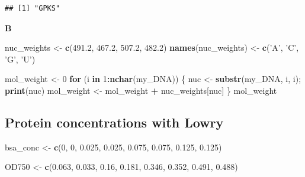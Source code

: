 \documentclass[]{book}
\newenvironment{Shaded}{\begin{snugshade}}{\end{snugshade}}
\newcommand{\ControlFlowTok}[1]{\textcolor[rgb]{0.13,0.29,0.53}{\textbf{#1}}}
\newcommand{\DecValTok}[1]{\textcolor[rgb]{0.00,0.00,0.81}{#1}}
\newcommand{\FloatTok}[1]{\textcolor[rgb]{0.00,0.00,0.81}{#1}}
\newcommand{\KeywordTok}[1]{\textcolor[rgb]{0.13,0.29,0.53}{\textbf{#1}}}
\newcommand{\NormalTok}[1]{#1}
\newcommand{\OperatorTok}[1]{\textcolor[rgb]{0.81,0.36,0.00}{\textbf{#1}}}
\newcommand{\StringTok}[1]{\textcolor[rgb]{0.31,0.60,0.02}{#1}}
\begin{document}
\begin{verbatim}
## [1] "GPKS"
\end{verbatim}

\textbf{B}

\begin{Shaded}
\begin{Highlighting}[]
\NormalTok{nuc_weights <-}\StringTok{ }\KeywordTok{c}\NormalTok{(}\FloatTok{491.2}\NormalTok{, }\FloatTok{467.2}\NormalTok{, }\FloatTok{507.2}\NormalTok{, }\FloatTok{482.2}\NormalTok{)}
\KeywordTok{names}\NormalTok{(nuc_weights) <-}\StringTok{ }\KeywordTok{c}\NormalTok{(}\StringTok{'A'}\NormalTok{, }\StringTok{'C'}\NormalTok{, }\StringTok{'G'}\NormalTok{, }\StringTok{'U'}\NormalTok{)}

\NormalTok{mol_weight <-}\StringTok{ }\DecValTok{0}
\ControlFlowTok{for}\NormalTok{ (i }\ControlFlowTok{in} \DecValTok{1}\OperatorTok{:}\KeywordTok{nchar}\NormalTok{(my_DNA)) \{}
\NormalTok{        nuc <-}\StringTok{ }\KeywordTok{substr}\NormalTok{(my_DNA, i, i);}
        \KeywordTok{print}\NormalTok{(nuc)}
\NormalTok{        mol_weight <-}\StringTok{ }\NormalTok{mol_weight }\OperatorTok{+}\StringTok{ }\NormalTok{nuc_weights[nuc]}
\NormalTok{\}}
\NormalTok{mol_weight}
\end{Highlighting}
\end{Shaded}

\hypertarget{protein-concentrations-with-lowry-1}{%
\subsection{Protein concentrations with Lowry}\label{protein-concentrations-with-lowry-1}}

\begin{Shaded}
\begin{Highlighting}[]
\NormalTok{bsa_conc <-}\StringTok{ }\KeywordTok{c}\NormalTok{(}\DecValTok{0}\NormalTok{,    }\DecValTok{0}\NormalTok{,  }\FloatTok{0.025}\NormalTok{,  }\FloatTok{0.025}\NormalTok{,  }\FloatTok{0.075}\NormalTok{,  }\FloatTok{0.075}\NormalTok{,  }\FloatTok{0.125}\NormalTok{,  }\FloatTok{0.125}\NormalTok{)}
\end{Highlighting}
\end{Shaded}

\begin{Shaded}
\begin{Highlighting}[]
\NormalTok{OD750 <-}\StringTok{ }\KeywordTok{c}\NormalTok{(}\FloatTok{0.063}\NormalTok{,   }\FloatTok{0.033}\NormalTok{,  }\FloatTok{0.16}\NormalTok{,   }\FloatTok{0.181}\NormalTok{,  }\FloatTok{0.346}\NormalTok{,  }\FloatTok{0.352}\NormalTok{,  }\FloatTok{0.491}\NormalTok{,  }\FloatTok{0.488}\NormalTok{)}
\end{Highlighting}
\end{Shaded}
\end{document}
